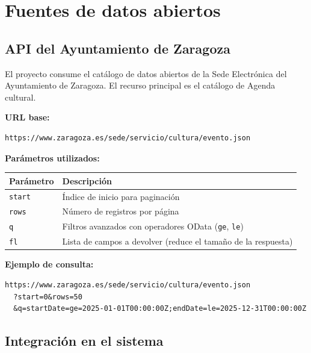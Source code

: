 \documentclass[12pt, a4paper]{article}
\begin{document}
\section{Fuentes de datos abiertos}

\subsection{API del Ayuntamiento de Zaragoza}

El proyecto consume el catálogo de datos abiertos de la Sede Electrónica del Ayuntamiento
de Zaragoza. El recurso principal es el catálogo de Agenda cultural.

\textbf{URL base:}

\begin{lstlisting}
https://www.zaragoza.es/sede/servicio/cultura/evento.json
\end{lstlisting}

\textbf{Parámetros utilizados:}

\begin{center}
\begin{tabular}{ll}
  \toprule
  \textbf{Parámetro} & \textbf{Descripción} \\
  \midrule
  \texttt{start} & Índice de inicio para paginación \\
  \texttt{rows}  & Número de registros por página \\
  \texttt{q}     & Filtros avanzados con operadores OData (\texttt{ge}, \texttt{le}) \\
  \texttt{fl}    & Lista de campos a devolver (reduce el tamaño de la respuesta) \\
  \bottomrule
\end{tabular}
\end{center}

\textbf{Ejemplo de consulta:}

\begin{lstlisting}
https://www.zaragoza.es/sede/servicio/cultura/evento.json
  ?start=0&rows=50
  &q=startDate=ge=2025-01-01T00:00:00Z;endDate=le=2025-12-31T00:00:00Z
\end{lstlisting}

\subsection{Integración en el sistema}
\end{document}
